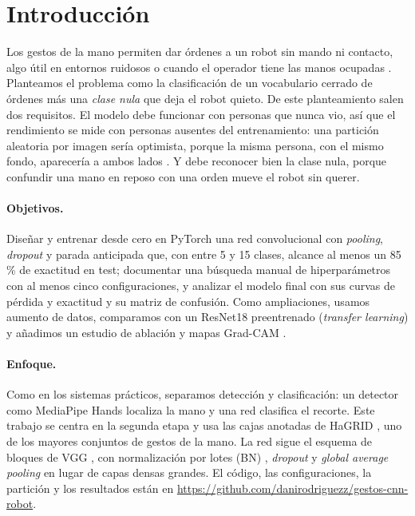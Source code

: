 \section{Introducción}
\label{sec:introduccion}

Los gestos de la mano permiten dar órdenes a un robot sin mando ni contacto, algo útil en entornos
ruidosos o cuando el operador tiene las manos ocupadas \citep{pisharady2015review}. Planteamos el
problema como la clasificación de un vocabulario cerrado de órdenes más una \emph{clase nula} que
deja el robot quieto. De este planteamiento salen dos requisitos. El modelo debe funcionar con
personas que nunca vio, así que el rendimiento se mide con personas ausentes del entrenamiento: una
partición aleatoria por imagen sería optimista, porque la misma persona, con el mismo fondo,
aparecería a ambos lados \citep{kaufman2012leakage}. Y debe reconocer bien la clase nula, porque
confundir una mano en reposo con una orden mueve el robot sin querer.

\paragraph{Objetivos.}
Diseñar y entrenar desde cero en PyTorch \citep{paszke2019pytorch} una red convolucional con
\emph{pooling}, \emph{dropout} y parada anticipada que, con entre 5 y 15 clases, alcance al menos
un 85\,\% de exactitud en test;
documentar una búsqueda manual de hiperparámetros con al menos cinco configuraciones, y analizar
el modelo final con sus curvas de pérdida y exactitud y su matriz de confusión. Como
ampliaciones, usamos aumento de datos, comparamos con un ResNet18 preentrenado
\citep{he2016resnet} (\emph{transfer learning}) y añadimos un estudio de ablación y mapas
Grad-CAM \citep{selvaraju2017gradcam}.

\paragraph{Enfoque.}
Como en los sistemas prácticos, separamos detección y clasificación: un detector como MediaPipe
Hands \citep{zhang2020mediapipe} localiza la mano y una red clasifica el recorte. Este trabajo se
centra en la segunda etapa y usa las cajas anotadas de HaGRID \citep{kapitanov2024hagrid}, uno de
los mayores conjuntos de gestos de la mano. La red sigue el esquema de bloques de VGG
\citep{simonyan2015vgg}, con normalización por lotes (BN) \citep{ioffe2015bn}, \emph{dropout}
\citep{srivastava2014dropout} y \emph{global average pooling} \citep{lin2014nin} en lugar de capas
densas grandes. El código, las configuraciones, la partición y los resultados están en
\url{https://github.com/danirodriguezz/gestos-cnn-robot}.
